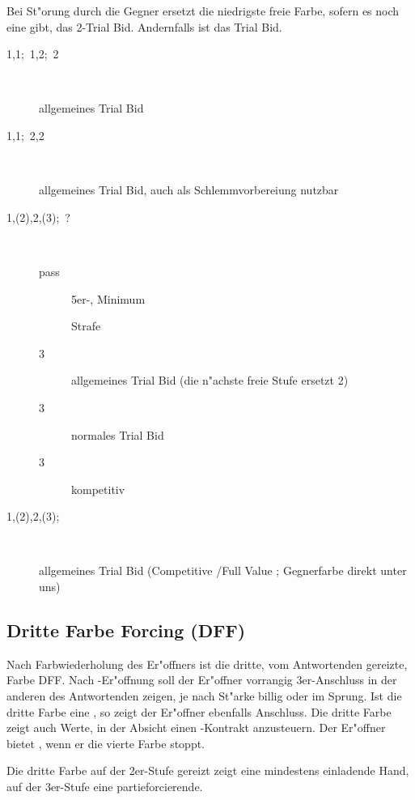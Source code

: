Bei St"orung durch die Gegner ersetzt die niedrigste freie Farbe, sofern es
noch eine gibt, das 2\SA-Trial Bid. Andernfalls ist \kontra das Trial Bid.

\begin{description}
\item[1\tre{}\sep1\coe;~1\pik{}\sep2\pik;~2\SA]~

  allgemeines Trial Bid
\item[1\tre{}\sep1\pik;~2\pik{}\sep2\SA]~

  allgemeines Trial Bid, auch als Schlemmvorbereiung nutzbar
\item[1\pik{}\sep(2\tre)\sep2\pik{}\sep(3\tre);~?]~
  \begin{description}
    \item[pass] 5er-\pi, Minimum
    \item[\kontra] Strafe
    \item[3\kar] allgemeines Trial Bid (die n"achste freie Stufe
      ersetzt 2\SA)
    \item[3\coe] normales Trial Bid
    \item[3\pik] kompetitiv
  \end{description}
\item[1\pik{}\sep(2\coe)\sep2\pik{}\sep(3\coe);~\kontra]~

  allgemeines Trial Bid (Competitive \kontra/Full Value \kontra;
  Gegnerfarbe direkt unter uns)
\end{description}

\subsection{Dritte Farbe Forcing (DFF)} \label{dff}

Nach Farbwiederholung des Er"offners ist die dritte, vom Antwortenden gereizte,
Farbe DFF. Nach \ofa-Er"offnung soll der Er"offner vorrangig 3er-Anschluss in
der anderen \ofa des Antwortenden zeigen, je nach St"arke billig oder im
Sprung. Ist die dritte Farbe eine \ofa, so zeigt der Er"offner ebenfalls
Anschluss. Die dritte Farbe zeigt auch Werte, in der Absicht einen \sa-Kontrakt
anzusteuern. Der Er"offner bietet \sa, wenn er die vierte Farbe stoppt.

Die dritte Farbe auf der 2er-Stufe gereizt zeigt eine mindestens einladende
Hand, auf der 3er-Stufe eine partieforcierende.



